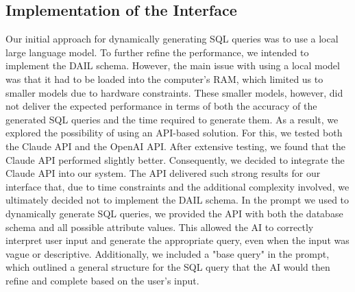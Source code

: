 \documentclass[../../submission.tex]{subfiles}
\begin{document}
\subsection{Implementation of the Interface}
Our initial approach for dynamically generating SQL queries was to use a local large language model. To further refine the performance, we intended to implement the DAIL schema. However, the main issue with using a local model was that it had to be loaded into the computer’s RAM, which limited us to smaller models due to hardware constraints. These smaller models, however, did not deliver the expected performance in terms of both the accuracy of the generated SQL queries and the time required to generate them.
As a result, we explored the possibility of using an API-based solution. For this, we tested both the Claude API and the OpenAI API. After extensive testing, we found that the Claude API performed slightly better. Consequently, we decided to integrate the Claude API into our system. The API delivered such strong results for our interface that, due to time constraints and the additional complexity involved, we ultimately decided not to implement the DAIL schema.
In the prompt we used to dynamically generate SQL queries, we provided the API with both the database schema and all possible attribute values. This allowed the AI to correctly interpret user input and generate the appropriate query, even when the input was vague or descriptive. Additionally, we included a "base query" in the prompt, which outlined a general structure for the SQL query that the AI would then refine and complete based on the user's input.
\end{document}
